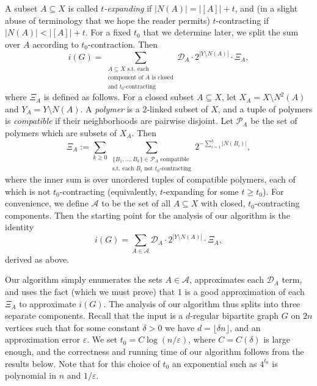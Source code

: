 \documentclass[11pt,letterpaper]{amsart}
\theoremstyle{definition}
\newcommand{\eps}{\varepsilon}
\renewcommand{\subset}{\subseteq}
\begin{document}
A subset $A\subset X$ is called \emph{$t$-expanding} if $|N(A)| = |[A]| + t$, and (in a slight abuse of terminology that we hope the reader permits) $t$-contracting if $|N(A)| < |[A]| + t$. For a fixed $t_0$ that we determine later, we split the sum over $A$ according to $t_0$-contraction.
Then
\begin{equation}\label{eq:iGexpanding}
    i(G) = \sum_{\substack{A\subset X\text{ s.t.\ each}\\\text{component of $A$ is closed} \\ \text{and $t_0$-contracting}}} \mathcal{D}_A\cdot 2^{|Y\setminus N(A)|} \cdot \Xi_A,
\end{equation}
where $\Xi_A$ is defined as follows. For a closed subset $A\subset X$, 
let $X_A = X\setminus N^2(A)$ and $Y_A = Y\setminus N(A)$. 
A \emph{polymer} is a 2-linked subset of $X$, and a tuple of polymers is \emph{compatible} if their neighborhoods are pairwise disjoint. 
Let $\mathcal{P}_A$ be the set of polymers which are subsets of $X_A$.
Then 
\[ \Xi_A := \sum_{k\ge 0}\sum_{\substack{\{B_1,\dotsc,B_k\}\in\mathcal{P}_A\text{ compatible}\\\text{s.t.\ each $B_i$ not $t_0$-contracting}}} 2^{-\sum_{i=1}^k |N(B_i)|},\]
where the inner sum is over unordered tuples of compatible polymers, each of which is not $t_0$-contracting (equivalently, $t$-expanding for some $t\ge t_0$).
For convenience, we define $\mathcal{A}$ to be the set of all $A\subset X$ with closed, $t_0$-contracting components. 
Then the starting point for the analysis of our algorithm is the identity 
\begin{equation}\label{eq:iGidentity}
    i(G) = \sum_{A\in\mathcal{A}} \mathcal{D}_A\cdot 2^{|Y\setminus N(A)|} \cdot \Xi_A,
\end{equation}
derived as above.

Our algorithm simply enumerates the sets $A\in \mathcal{A}$, approximates each $\mathcal{D}_A$ term, and uses the fact (which we must prove) that $1$ is a good approximation of each $\Xi_A$ to approximate $i(G)$. 
The analysis of our algorithm thus splits into three separate components. 
Recall that the input is a $d$-regular bipartite graph $G$ on $2n$ vertices such that for some constant $\delta>0$ we have $d=\lfloor\delta n\rfloor$, and an approximation error $\eps$. We set $t_0=C\log(n/\eps)$, where $C=C(\delta)$ is large enough, and the correctness and running time of our algorithm follows from the results below. 
Note that for this choice of $t_0$ an exponential such as $4^{t_0}$ is polynomial in $n$ and $1/\eps$.
\end{document}
